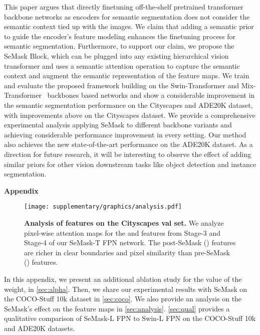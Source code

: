 \documentclass[10pt,twocolumn,letterpaper]{article}
\begin{document}
This paper argues that directly finetuning off-the-shelf pretrained transformer backbone networks as encoders for semantic segmentation does not consider the semantic context tied up with the images. We claim that adding a semantic prior to guide the encoder's feature modeling enhances the finetuning process for semantic segmentation. Furthermore, to support our claim, we propose the SeMask Block, which can be plugged into any existing hierarchical vision transformer and uses a semantic attention operation to capture the semantic context and augment the semantic representation of the feature maps. We train and evaluate the proposed framework building on the Swin-Transformer \cite{swin-T} and Mix-Transformer~\cite{segformer} backbones based networks and show a considerable improvement in the semantic segmentation performance on the Cityscapes and ADE20K dataset, with improvements above  on the Cityscapes dataset. We provide a comprehensive experimental analysis applying SeMask to different backbone variants and achieving considerable performance improvement in every setting. Our method also achieves the new state-of-the-art performance on the ADE20K dataset. As a direction for future research, it will be interesting to observe the effect of adding similar priors for other vision downstream tasks like object detection and instance segmentation. 



\appendix
\begin{center}{\bf \Large Appendix}\end{center}\vspace{-2mm}
\renewcommand{\thetable}{\Roman{table}}
\renewcommand{\thefigure}{\Roman{figure}}
\setcounter{table}{0}
\setcounter{figure}{0}


\begin{figure*}[ht!]
\centering
\texttt{[image: supplementary/graphics/analysis.pdf]}
\caption{
  \textbf{Analysis of features on the Cityscapes val set.} We analyze pixel-wise attention maps for the  and  features from Stage-3 and Stage-4 of our SeMask-T FPN network. The post-SeMask () features are richer in clear boundaries and pixel similarity than pre-SeMask () features.}
  \label{fig:analysis}
\end{figure*}

In this appendix, we present an additional ablation study for the value of the weight,  in \cref{sec:alpha}. Then, we share our experimental results with SeMask on the COCO-Stuff 10k dataset in \cref{sec:coco}.  We also provide an analysis on the SeMask's effect on the feature maps in \cref{sec:analysis}. \cref{sec:qual} provides a qualitative comparison of SeMask-L FPN to Swin-L FPN on the COCO-Stuff 10k \cite{coco} and ADE20K \cite{ade20k} datasets. 
\end{document}
